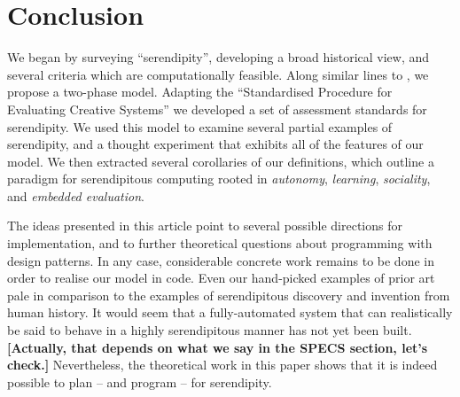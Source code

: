 \section{Conclusion} \label{sec:conclusion}

%
We began by surveying ``serendipity'', developing a broad historical
view, and several criteria which are computationally feasible.  Along
similar lines to , we propose a two-phase
model.
%
%
Adapting the ``Standardised Procedure for Evaluating Creative
Systems'' we developed a set of assessment standards for serendipity.
%
%
We used this model to examine several partial examples of serendipity,
and a thought experiment that exhibits all of the features of our
model.
%
We then extracted several corollaries of our definitions, which
outline a paradigm for serendipitous computing rooted in
\emph{autonomy}, \emph{learning}, \emph{sociality}, and \emph{embedded
  evaluation}.


The ideas presented in this article point to several possible
directions for implementation, and to further theoretical questions
about programming with design patterns.  In any case, considerable
concrete work remains to be done in order to realise our model in
code.  Even our hand-picked examples of prior art pale in comparison
to the examples of serendipitous discovery and invention from human
history.  It would seem that a fully-automated system that can
realistically be said to behave in a highly serendipitous manner has
not yet been built. \textbf{[Actually, that depends on what we say in
    the SPECS section, let's check.]}
Nevertheless, the theoretical work in this paper shows that it is
indeed possible to plan -- and program -- for serendipity.
